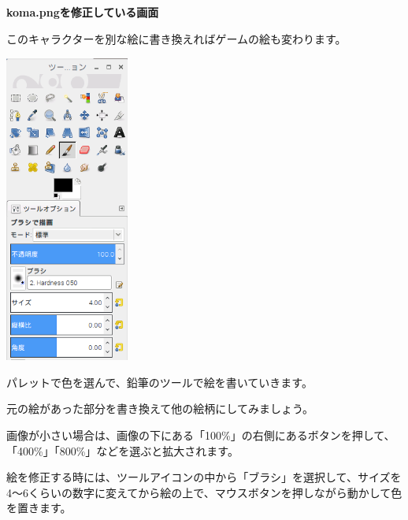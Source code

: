\documentclass[a4paper,dvipdfmx]{jarticle}
\newcommand\textstyleqwerty[1]{#1}
\begin{document}
\bigskip


\bigskip


\bigskip


\bigskip

{\bfseries
koma.pngを修正している画面}


\bigskip


\bigskip


\bigskip


\bigskip


\bigskip


\bigskip


\bigskip

\textstyleqwerty{このキャラクターを別な絵に書き換えればゲームの絵も変わります。}

\begin{center}
\includegraphics[width=4.075cm,height=10.16cm]{text02-img/text02-img039.png}

\end{center}
パレットで色を選んで、鉛筆のツールで絵を書いていきます。

元の絵があった部分を書き換えて他の絵柄にしてみましょう。


\bigskip

画像が小さい場合は、画像の下にある「100\%」の右側にあるボタンを押して、「400\%」「800\%」などを選ぶと拡大されます。

絵を修正する時には、ツールアイコンの中から「ブラシ」を選択して、サイズを4〜6くらいの数字に変えてから絵の上で、マウスボタンを押しながら動かして色を置きます。


\bigskip
\end{document}

